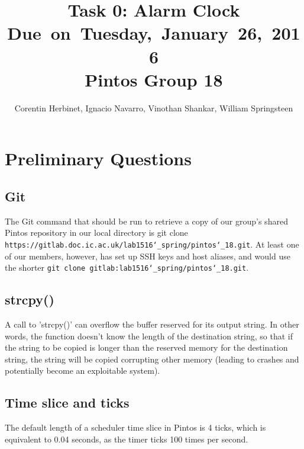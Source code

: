 \documentclass{article}
\title{
\vspace{2in}
\textmd{\textbf{Task 0: Alarm Clock}}\\
\normalsize\vspace{0.1in}\small{Due\ on\ Tuesday,\ January\ 26,\ 2016}\\
\vspace{0.1in}\large{\textbf{Pintos Group 18}}
\vspace{3in}
}
\author{Corentin Herbinet, Ignacio Navarro, Vinothan Shankar, William Springsteen}
\date{}
\begin{document}
\maketitle

\newpage


\section{Preliminary Questions}
\subsection{Git}
The Git command that should be run to retrieve a copy of our group's shared 
Pintos repository in our local directory is git clone \texttt{https://gitlab.doc.ic.ac.uk/lab1516\char`_spring/pintos\char`_18.git}.
At least one of our members, however, has set up SSH keys and host aliases,
and would use the shorter \texttt{git clone gitlab:lab1516\char`_spring/pintos\char`_18.git}.

\subsection{strcpy()}
A call to 'strcpy()' can overflow the buffer reserved for its output string. 
In other words, the function doesn't know the length of the destination string,
so that if the string to be copied is longer than the reserved memory for 
the destination string, the string will be copied corrupting other memory 
(leading to crashes and potentially become an exploitable system).


\subsection{Time slice and ticks}
The default length of a scheduler time slice in Pintos is 4 ticks, 
which is equivalent to 0.04 seconds, as the timer ticks 100 times per second.
\end{document}
